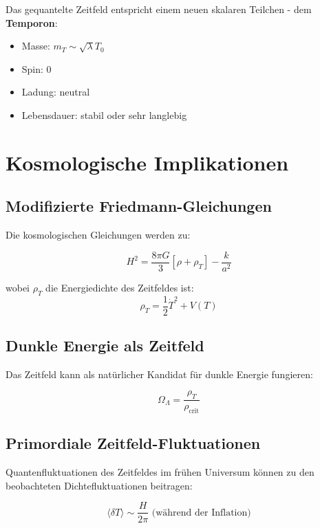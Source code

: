 \documentclass[12pt,a4paper]{report}
\begin{document}
Das gequantelte Zeitfeld entspricht einem neuen skalaren Teilchen - dem \textbf{Temporon}:
\begin{itemize}
	\item Masse: $m_T \sim \sqrt{\lambda}T_0$
	\item Spin: 0
	\item Ladung: neutral
	\item Lebensdauer: stabil oder sehr langlebig
\end{itemize}

\section{Kosmologische Implikationen}

\subsection{Modifizierte Friedmann-Gleichungen}

Die kosmologischen Gleichungen werden zu:

\begin{equation}
	H^2 = \frac{8\pi G}{3}[\rho + \rho_T] - \frac{k}{a^2}
\end{equation}

wobei $\rho_T$ die Energiedichte des Zeitfeldes ist:
\begin{equation}
	\rho_T = \frac{1}{2}\dot{T}^2 + V(T)
\end{equation}

\subsection{Dunkle Energie als Zeitfeld}

Das Zeitfeld kann als natürlicher Kandidat für dunkle Energie fungieren:

\begin{equation}
	\Omega_{\Lambda} = \frac{\rho_T}{\rho_{\text{crit}}}
\end{equation}

\subsection{Primordiale Zeitfeld-Fluktuationen}

Quantenfluktuationen des Zeitfeldes im frühen Universum können zu den beobachteten Dichtefluktuationen beitragen:

\begin{equation}
	\langle\delta T\rangle \sim \frac{H}{2\pi} \text{ (während der Inflation)}
\end{equation}
\end{document}

